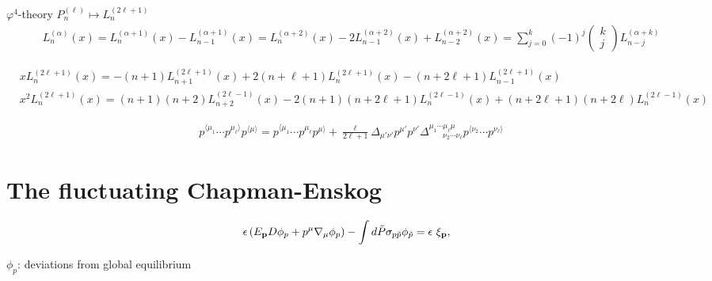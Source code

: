 \documentclass[aps,prd,preprint,nofootinbib,amsmath,amssymb,showpacs,longbibliography,singlecolumn,superscriptaddress,10pt]{revtex4-1}
\theoremstyle{plain}
\theoremstyle{definition}
\begin{document}
$\varphi^{4}$-theory  $P_{n}^{(\ell)} \mapsto L_{n}^{(2 \ell +1)}$
\begin{equation}
\begin{aligned}
&
L_{n}^{(\alpha)}(x) = L_{n}^{(\alpha+1)}(x) - L_{n-1}^{(\alpha+1)}(x) 
=
L_{n}^{(\alpha+2)}(x) 
-
2 L_{n-1}^{(\alpha+2)}(x)
+
L_{n-2}^{(\alpha+2)}(x)
=
\sum_{j=0}^{k}(-1)^{j} \left(\begin{array}{c}
k  \\
j    
\end{array}
\right)
L_{n-j}^{(\alpha + k)}
\end{aligned}    
\end{equation}


\begin{equation}
\begin{aligned}
&
x L_{n}^{(2 \ell +1)}(x) 
=
-
(n+1) L_{n+1}^{(2 \ell +1)}(x)
+
2(n+ \ell +1) L_{n}^{(2 \ell +1)}(x)
-
(n+2 \ell +1) L_{n-1}^{(2 \ell +1)}(x)
\\
&
x^{2} L_{n}^{(2 \ell +1)}(x) 
=
(n+1)(n+2) L_{n+2}^{(2 \ell -1)}(x)
-
2(n+1)(n+2\ell+1) L_{n}^{(2 \ell -1)}(x)
+
(n+2\ell+1)(n+2\ell) L_{n}^{(2 \ell -1)}(x)
\end{aligned}    
\end{equation}


\begin{equation}
\begin{aligned}
&
p^{\langle \mu_{1}} \cdots p^{ \mu_{\ell} \rangle} 
 p^{\langle \mu \rangle} 
 =
p^{\langle \mu_{1}} \cdots p^{ \mu_{\ell} } 
 p^{\mu \rangle} 
 +
 \frac{\ell}{2 \ell + 1}
 \Delta_{\mu' \nu'} p^{\mu'} p^{\nu'}
\Delta^{\mu_{1} \cdots \mu_{\ell} \mu}_{ \ \ \ \ \ \ \ \ \nu_{2} \cdots \nu_{\ell}} 
p^{\langle \nu_{2}} \cdots p^{ \nu_{\ell} \rangle} 
\end{aligned}    
\end{equation}

\section{The fluctuating Chapman-Enskog}



\begin{equation}
   \epsilon \left( E_{\bf p} D \phi_p +  p^{\mu} \nabla_{\mu} \phi_p \right) 
   -
\int d \Tilde{P} \sigma_{p \Tilde{p}} \phi_{\Tilde{p}} = \epsilon \ \xi_{\bf p} ,
\end{equation}

$\phi_p$: deviations from global equilibrium
\end{document}
